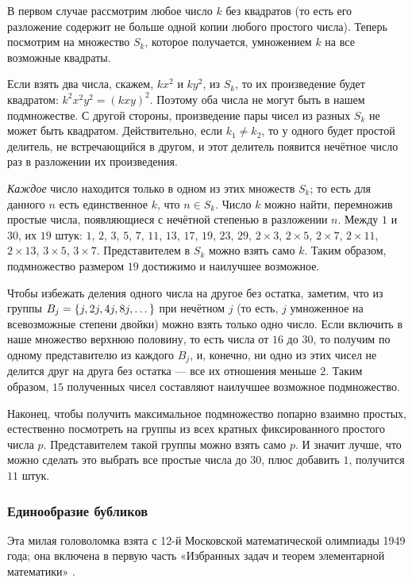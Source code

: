 В первом случае рассмотрим любое число $k$ без квадратов (то есть его разложение содержит не больше одной копии любого простого числа).
Теперь посмотрим на множество $S_k$, которое получается, умножением $k$ на все возможные квадраты.

Если взять два числа, скажем, $kx^2$ и $ky^2$, из $S_k$, то их произведение будет квадратом: $k^2x^2y^2 = (kxy)^2$.
Поэтому оба числа не могут быть в нашем подмножестве.
С другой стороны, произведение пары чисел из разных $S_k$ не может быть квадратом.
Действительно, если $k_1\ne k_2$, то у одного будет простой делитель, не встречающийся в другом, и этот делитель появится нечётное число раз в разложении их произведения.

\emph{Каждое} число находится только в одном из этих множеств $S_k$;
то есть для данного $n$ есть единственное $k$, что $n \in S_k$.
Число $k$ можно найти, перемножив простые числа, появляющиеся с нечётной степенью в разложении $n$.
Между $1$ и $30$, их $19$ штук: $1$, $2$, $3$, $5$, $7$, $11$, $13$, $17$, $19$,
$23$, $29$, $2 \times 3$, $2 \times 5$, $2 \times 7$, $2 \times 11$, $2 \times 13$, $3 \times 5$, $3 \times 7$.
Представителем в $S_k$ можно взять само $k$.
Таким образом, подмножество размером $19$ достижимо и наилучшее возможное.

Чтобы избежать деления одного числа на другое без остатка, заметим, что из группы $B_j \z= \{j, 2j, 4j, 8j, \dots\}$ при нечётном $j$ (то есть, $j$ умноженное на всевозможные степени двойки) можно взять только одно число.
Если включить в наше множество верхнюю половину, то есть числа от $16$ до $30$, то получим по одному представителю из каждого $B_j$, и, конечно, ни одно из этих чисел не делится друг на друга без остатка --- все их отношения меньше $2$.
Таким образом, $15$ полученных чисел составляют наилучшее возможное подмножество.

Наконец, чтобы получить максимальное подмножество попарно взаимно простых, естественно посмотреть на группы из всех кратных фиксированного простого числа $p$.
Представителем такой группы можно взять само $p$. 
И значит лучше, что можно сделать это выбрать все простые числа до $30$, плюс добавить $1$, получится $11$ штук.

\subsubsection*{Единообразие бубликов}

Эта милая головоломка взята с 12-й Московской математической олимпиады 1949 года;
она включена в первую часть «Избранных задач и теорем элементарной математики» %
\cite[задача 127, стр. 28]{51}.

